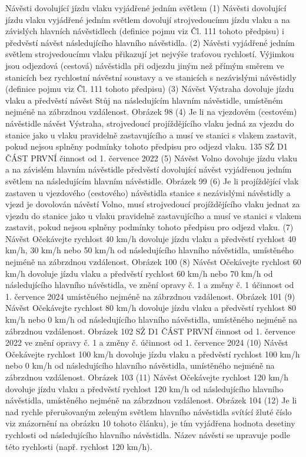 \documentclass[english, ing, kiv, he, iso690alph, pdf, viewonly]{fasthesis}
\begin{document}
Návěsti dovolující jízdu vlaku vyjádřené jedním světlem
(1) Návěsti dovolující jízdu vlaku vyjádřené jedním světlem dovolují strojvedoucímu jízdu vlaku
a na závislých hlavních návěstidlech (definice pojmu viz Čl. 111 tohoto předpisu) i předvěstí
návěst následujícího hlavního návěstidla.
(2) Návěsti vyjádřené jedním světlem strojvedoucímu vlaku přikazují jet nejvýše traťovou
rychlostí. Výjimkou jsou odjezdová (cestová) návěstidla při odjezdu jiným než přímým
směrem ve stanicích bez rychlostní návěstní soustavy a ve stanicích s nezávislými
návěstidly (definice pojmu viz Čl. 111 tohoto předpisu)
(3) Návěst Výstraha dovoluje jízdu vlaku a předvěstí návěst Stůj
na následujícím hlavním návěstidle, umístěném nejméně na zábrzdnou vzdálenost.
Obrázek 98
(4) Je li na vjezdovém (cestovém) návěstidle návěst Výstraha, strojvedoucí projíždějícího
vlaku jedná za vjezdu do stanice jako u vlaku pravidelně zastavujícího a musí ve stanici
s vlakem zastavit, pokud nejsou splněny podmínky tohoto předpisu pro odjezd vlaku.
135
SŽ D1 ČÁST PRVNÍ činnost od 1. července 2022
(5) Návěst Volno dovoluje jízdu vlaku a na závislém hlavním návěstidle
předvěstí dovolující návěst vyjádřenou jedním světlem na následujícím hlavním návěstidle.
Obrázek 99
(6) Je li projíždějící vlak zastaven u vjezdového (cestového) návěstidla stanice
s nezávislými návěstidly a vjezd je dovolován návěstí Volno, musí strojvedoucí
projíždějícího vlaku jednat za vjezdu do stanice jako u vlaku pravidelně zastavujícího
a musí ve stanici s vlakem zastavit, pokud nejsou splněny podmínky tohoto předpisu
pro odjezd vlaku.
(7) Návěst Očekávejte rychlost 40 km/h dovoluje jízdu
vlaku a předvěstí rychlost 40 km/h, 30 km/h nebo 50 km/h od následujícího hlavního
návěstidla, umístěného nejméně na zábrzdnou vzdálenost.
Obrázek 100
(8) Návěst Očekávejte rychlost 60 km/h dovoluje jízdu
vlaku a předvěstí rychlost 60 km/h nebo 70 km/h od následujícího hlavního návěstidla,
ve znění opravy č. 1 a změny č. 1 účinnost od 1. července 2024
umístěného nejméně na zábrzdnou vzdálenost.
Obrázek 101
(9) Návěst Očekávejte rychlost 80 km/h dovoluje jízdu
vlaku a předvěstí rychlost 80 km/h nebo 0 km/h od následujícího hlavního návěstidla,
umístěného nejméně na zábrzdnou vzdálenost.
Obrázek 102
SŽ D1 ČÁST PRVNÍ činnost od 1. července 2022
ve znění opravy č. 1 a změny č. účinnost od 1. července 2024
(10) Návěst Očekávejte rychlost 100 km/h dovoluje jízdu
vlaku a předvěstí rychlost 100 km/h nebo 0 km/h od následujícího hlavního návěstidla,
umístěného nejméně na zábrzdnou vzdálenost.
Obrázek 103
(11) Návěst Očekávejte rychlost 120 km/h
dovoluje jízdu vlaku a předvěstí rychlost 120 km/h od následujícího
hlavního návěstidla, umístěného nejméně na zábrzdnou vzdálenost.
Obrázek 104
(12) Je li nad rychle přerušovaným zeleným světlem hlavního návěstidla svítící žluté číslo
viz znázornění na obrázku 10 tohoto článku), je tím vyjádřena hodnota desetiny rychlosti
od následujícího hlavního návěstidla. Název návěsti se upravuje podle této rychlosti
(např. rychlost 120 km/h).
\end{document}
